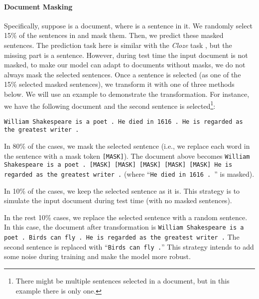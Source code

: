 \documentclass[11pt,a4paper]{article}
\begin{document}
\paragraph{Document Masking} Specifically, suppose  is a document,  where  is a sentence in it. We randomly select 15\% of the sentences in  and mask them. Then, we predict these masked sentences. The prediction task here is similar with the \emph{Cloze} task \cite{taylor:1953:sage,devlin:2018:arxiv}, but the missing part is a sentence. However,  during test time the input document is not masked, to make our model can adapt to documents without masks, we do not always mask the selected sentences. Once a sentence is selected (as one of the 15\% selected masked sentences), we transform it with one of three methods below. We will use an example to demonstrate the transformation. For instance, we have the following document and the second sentence is selected\footnote{There might be multiple sentences selected in a document, but in this example there is only one.}:

{\tt \noindent William Shakespeare is a poet . He died in 1616 . He is regarded as the greatest writer .}

In 80\% of the cases, we mask the selected sentence (i.e., we replace each word in the sentence with a mask token {\tt [MASK]}). The document above becomes {\tt William Shakespeare is a poet . [MASK] [MASK] [MASK] [MASK] [MASK] He is regarded as the greatest writer .} (where ``{\tt He died in 1616 . }'' is masked). 

In 10\% of the cases,  we keep the selected sentence as it is. This strategy is to simulate the input document during test time (with no masked sentences).

In the rest 10\% cases, we replace the selected sentence with a random sentence. In this case, the document after transformation is {\tt William Shakespeare is a poet . Birds can fly . He is regarded as the greatest writer .}  The second sentence is replaced with ``{\tt Birds can fly .}'' This strategy intends to add some noise during training and make the model more robust.
\end{document}
